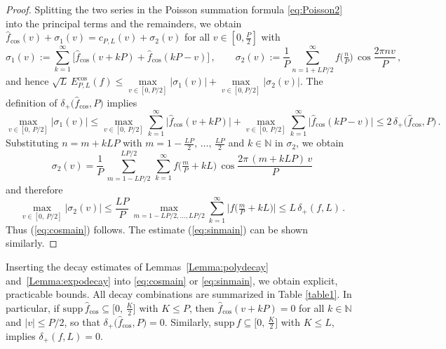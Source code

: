 \documentclass[11pt,a4paper]{scrartcl}
\numberwithin{equation}{section}
\numberwithin{table}{section}
\numberwithin{figure}{section}
\newcommand{\N}{\mathbb N}
\newcommand{\fcos}{{\hat f}_{\cos}}
\newcommand{\dpl}{\delta_{+}}
\newcommand{\Ecos}{E^{\cos}}
\begin{document}
\begin{proof} Splitting the two series in the Poisson summation formula
\eqref{eq:Poisson2} into the principal terms and the remainders, we obtain
$\fcos(v) + \sigma_1(v)= c_{P,L}(v) + \sigma_2(v)$ for all $v \in [0, \frac{P}{2}]$ with
$$
\textstyle \sigma_1(v) := \sum\limits_{k =1}^{\infty} \big[\fcos(v + k P) + \fcos(k P- v)\big]\,,\qquad
\sigma_2(v) := \frac{1}{P}\sum\limits_{n = 1 + LP/2}^{\infty} f\big(\tfrac{n}{P}\big)\,\cos \frac{2\pi nv}{P}\,,
$$
and hence $\sqrt L\,\Ecos_{P,L}(f) \leq \max\limits_{v \in [0,P/2]} |\sigma_1(v)| +
\max\limits_{v \in [0,P/2]} |\sigma_2(v)|$. The definition of $\dpl\big(\fcos,
P\big)$ implies
$$
\textstyle \max\limits_{v \in [0,\, P/2]} |\sigma_1(v)| \leq \max\limits_{v \in [0,\, P/2]} \sum\limits_{k=1}^{\infty}
\big|\fcos(v + k P)\big| + \max\limits_{v \in [0,\, P/2]} \sum\limits_{k=1}^{\infty} \big|\fcos(k P - v)\big|
\leq 2\,\dpl\big(\fcos, P\big)\,.
$$
Substituting $n = m + k LP$ with $m = 1-\tfrac{LP}{2},\,\ldots,\,\tfrac{LP}{2}$
and $k \in \N$ in $\sigma_2$, we obtain
$$
\textstyle \sigma_2(v) = \frac{1}{P}\,\sum\limits_{m=1-LP/2}^{LP/2}\,\sum\limits_{k=1}^{\infty} f\big(\tfrac{m}{P} + k L\big)\, \cos\frac{2\pi\,(m+k LP)\,v}{P}
$$
and therefore
$$
\textstyle \max\limits_{v \in [0,\,P/2]} |\sigma_2(v)| \leq \frac{L P}{P}\, \max\limits_{m= 1-LP/2,\ldots,LP/2} \sum\limits_{k=1}^{\infty} \big|f\big(\tfrac{m}{P} + k L\big)\big| \leq L\,\dpl(f,L)\,.
$$
Thus (\ref{eq:cosmain}) follows. The estimate (\ref{eq:sinmain}) can be shown similarly.
\end{proof}

Inserting the decay estimates of Lemmas~\ref{Lemma:polydecay}
and~\ref{Lemma:expodecay} into \eqref{eq:cosmain} or \eqref{eq:sinmain}, we obtain explicit,
practicable bounds. All decay combinations are summarized in Table \ref{table1}.
In particular, if
$\mathrm{supp}\,\fcos \subseteq \big[0,\,\frac{K}{2}\big]$ with $K \leq P$, then
$\fcos(v + kP) = 0$ for all $k \in \N$ and $|v| \leq P/2$, so that
$\dpl\big(\fcos, P\big) = 0$.  Similarly,  $\mathrm{supp}\,f \subseteq
\bigl[0,\,\frac{K}{2}\bigr]$ with $K \leq L$,
implies $\dpl(f, L) =0$.
\end{document}

